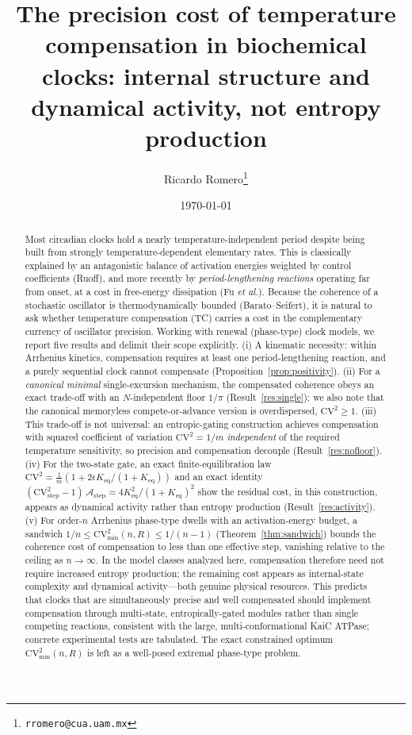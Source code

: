 \documentclass[11pt,onecolumn]{article}
\title{\bfseries The precision cost of temperature compensation in biochemical clocks: internal structure and dynamical activity, not entropy production}
\author[1]{Ricardo Romero\thanks{\texttt{rromero@cua.uam.mx}}}
\affil[1]{Departamento de Ciencias Naturales, Universidad Aut\'onoma Metropolitana--Cuajimalpa, Mexico City, Mexico}
\date{\today}
\theoremstyle{definition}
\newcommand{\CV}{\mathrm{CV}}
\newcommand{\Aact}{\mathcal{A}}
\newcommand{\Keq}{K_{\mathrm{eq}}}
\begin{document}
\maketitle

\begin{abstract}
\noindent
Most circadian clocks hold a nearly temperature-independent period despite being built from strongly temperature-dependent elementary rates. This is classically explained by an antagonistic balance of activation energies weighted by control coefficients (Ruoff), and more recently by \emph{period-lengthening reactions} operating far from onset, at a cost in free-energy dissipation (Fu \emph{et al.}). Because the coherence of a stochastic oscillator is thermodynamically bounded (Barato--Seifert), it is natural to ask whether temperature compensation (TC) carries a cost in the complementary currency of oscillator precision. Working with renewal (phase-type) clock models, we report five results and delimit their scope explicitly. (i) A kinematic necessity: within Arrhenius kinetics, compensation requires at least one period-lengthening reaction, and a purely sequential clock cannot compensate (Proposition~\ref{prop:positivity}). (ii) For a \emph{canonical minimal} single-excursion mechanism, the compensated coherence obeys an exact trade-off with an $N$-independent floor $1/\pi$ (Result~\ref{res:single}); we also note that the canonical memoryless compete-or-advance version is overdispersed, $\CV^2\ge 1$. (iii) This trade-off is not universal: an entropic-gating construction achieves compensation with squared coefficient of variation $\CV^2 = 1/m$ \emph{independent} of the required temperature sensitivity, so precision and compensation decouple (Result~\ref{res:nofloor}). (iv) For the two-state gate, an exact finite-equilibration law $\CV^2=\tfrac{1}{m}(1+2\epsilon\Keq/(1+\Keq))$ and an exact identity $(\CV^2_{\mathrm{step}}-1)\,\Aact_{\mathrm{step}}=4\Keq^2/(1+\Keq)^2$ show the residual cost, in this construction, appears as dynamical activity rather than entropy production (Result~\ref{res:activity}). (v) For order-$n$ Arrhenius phase-type dwells with an activation-energy budget, a sandwich $1/n \le \CV^2_{\min}(n,R)\le 1/(n-1)$ (Theorem~\ref{thm:sandwich}) bounds the coherence cost of compensation to less than one effective step, vanishing relative to the ceiling as $n\to\infty$. In the model classes analyzed here, compensation therefore need not require increased entropy production; the remaining cost appears as internal-state complexity and dynamical activity---both genuine physical resources. This predicts that clocks that are simultaneously precise and well compensated should implement compensation through multi-state, entropically-gated modules rather than single competing reactions, consistent with the large, multi-conformational KaiC ATPase; concrete experimental tests are tabulated. The exact constrained optimum $\CV^2_{\min}(n,R)$ is left as a well-posed extremal phase-type problem.
\end{abstract}
\end{document}
